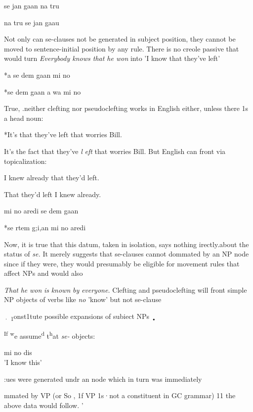 \ea\label{ex:2:167}
se jan gaan na tru
\z

\ea\label{ex:2:168}
na tru se jan gaau
\z

Not only can se-clauses not be generated in subject position, they cannot be moved to sentence-initial position by any rule. There is no creole passive that would turn \textit{Everybody knows that he won} into
'I know that they've left'

\ea\label{ex:2:173}
*a se dem gaan mi no
\z

\ea\label{ex:2:174}
 *se dem gaan a wa mi no
\z

True, .neither clefting nor pseudoclefting works in English either, unless there 1s a head noun:

\ea\label{ex:2:175}
 *It's that they've left that worries Bill.
\z

\ea\label{ex:2:176}
 It's the fact that they've \textit{l} \textit{eft} that worries Bill. But English can front via topicalization:
\z

\ea\label{ex:2:177}
 I knew already that they'd left.
\z

\ea\label{ex:2:178}
 That they'd left I knew already.
\z

\ea\label{ex:2:179}
 mi no aredi se dem gaan
\z

\ea\label{ex:2:180}
 *se rtem g;i,an mi no aredi
\z

Now, it is true that this datum, taken in isolation, says nothing irectly.about the status of \textit{se.} It merely suggests that se-clauses cannot dommated by an NP node since if they were, they would presumably be eligible for movement rules that affect NPs and would also

\textit{That} \textit{he} \textit{won} \textit{is} \textit{k}\textit{nown} \textit{by} \textit{everyone.} Clefting and pseudoclefting will
front simple NP objects of verbs like \textit{no }'know' but not se-clause 

\textsubscript{·} \textsubscript{1}onst1tute possible expansions of subiect NPs \textsubscript{•}

\textsuperscript{If} \textsuperscript{w}e assume\textsuperscript{d} t\textsuperscript{h}at \textit{se-}
objects:

\ea\label{ex:2:169}
 mi no dis\\
\glt  'I know this'
\z



:ues were generated undr an node which in turn was immediately

mmated by VP (or So , 1f VP 1s·not a constituent in GC grammar) 11 the above data would follow. '

